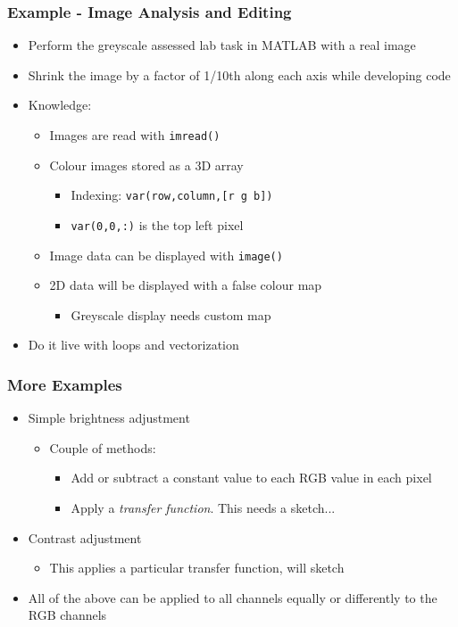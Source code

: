 \documentclass[14pt]{beamer}
\begin{document}
\begin{frame}
\frametitle{Example - Image Analysis and Editing}
\begin{itemize}
\item Perform the greyscale assessed lab task in MATLAB with a real image
\item Shrink the image by a factor of 1/10th along each axis while developing code
\item Knowledge:
	\begin{itemize}
		\item Images are read with \texttt{imread()}
		\item Colour images stored as a 3D array
			\begin{itemize}
				\item Indexing: \texttt{var(row,column,[r g b])}
				\item \texttt{var(0,0,:)} is the top left pixel
			\end{itemize}
		\item Image data can be displayed with \texttt{image()}
		\item 2D data will be displayed with a false colour map
			\begin{itemize}
				\item Greyscale display needs custom map
			\end{itemize}
	\end{itemize}

\item Do it live with loops and vectorization
\end{itemize}
\end{frame}

\begin{frame}
\frametitle{More Examples}
\begin{itemize}
\item Simple brightness adjustment
	\begin{itemize}
		\item Couple of methods:
			\begin{itemize}
				\item Add or subtract a constant value to each RGB value in each pixel
				\item Apply a \textit{transfer function}. This needs a sketch...
			\end{itemize}
	\end{itemize}
\item Contrast adjustment
	\begin{itemize}
		\item This applies a particular transfer function, will sketch
	\end{itemize}
\item All of the above can be applied to all channels equally or differently to the RGB channels
\end{itemize}
\end{frame}
\end{document}
